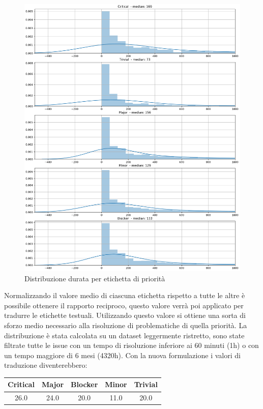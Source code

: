 \documentclass[%
    corpo=12pt,
    twoside,
    oldstyle,
    autoretitolo,
    greek,
    evenboxes,
]{toptesi}
\begin{document}
\begin{figure}[!ht]
  \includegraphics[width=\linewidth]{figure/duration_distr.png}
  \caption{Distribuzione durata per etichetta di priorità}
  \label{fig:duration_distr}
\end{figure}
Normalizzando il valore medio di ciascuna etichetta rispetto a tutte le altre è possibile ottenere il rapporto reciproco, questo valore verrà poi applicato per tradurre le etichette testuali. Utilizzando questo valore si ottiene una sorta di sforzo medio necessario alla risoluzione di problematiche di quella priorità. La distribuzione è stata calcolata su un dataset leggermente ristretto, sono state filtrate tutte le issue con un tempo di risoluzione inferiore ai 60 minuti (1h) o con un tempo maggiore di 6 mesi (4320h).
Con la nuova formulazione i valori di traduzione diventerebbero:
\begin{center}
   \label{tab:priority_distr}
  \begin{tabular}{ |c|c|c|c|c| }
     \hline
     \textbf{Critical} & \textbf{Major} & \textbf{Blocker} & \textbf{Minor} & \textbf{Trivial} \\
     \hline
     \hline
     26.0 & 24.0 & 20.0 & 11.0 & 20.0 \\
     \hline
  \end{tabular}
\end{center}
\end{document}
